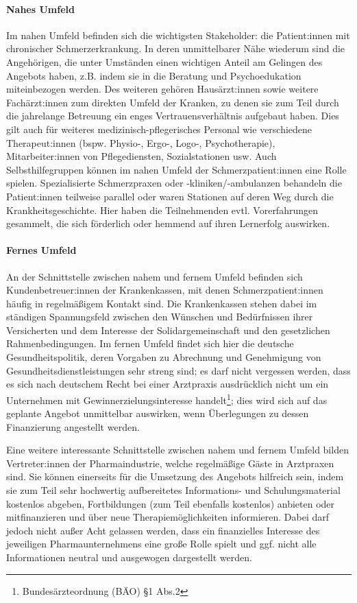 \documentclass[
  twoside,
  parskip=half-,
  paper=176mm:246mm,
  BCOR=14mm,
  DIV=14,
]{scrreprt}
\begin{document}
\begin{praxis}
\paragraph{Nahes Umfeld} Im nahen Umfeld befinden sich die wichtigsten Stakeholder: die Patient:innen mit chronischer Schmerzerkrankung. In deren unmittelbarer Nähe wiederum sind die Angehörigen, die unter Umständen einen wichtigen Anteil am Gelingen des Angebots haben, z.B. indem sie in die Beratung und Psychoedukation miteinbezogen werden. Des weiteren gehören Hausärzt:innen sowie weitere Fachärzt:innen zum direkten Umfeld der Kranken, zu denen sie zum Teil durch die jahrelange Betreuung ein enges Vertrauensverhältnis aufgebaut haben. Dies gilt auch für weiteres medizinisch-pflegerisches Personal wie verschiedene Therapeut:innen (bspw. Physio-, Ergo-, Logo-, Psychotherapie), Mitarbeiter:innen von Pflegediensten, Sozialstationen usw. Auch Selbsthilfegruppen können im nahen Umfeld der Schmerzpatient:innen eine Rolle spielen. Spezialisierte Schmerzpraxen oder -kliniken/-ambulanzen behandeln die Patient:innen teilweise parallel oder waren Stationen auf deren Weg durch die Krankheitsgeschichte. Hier haben die Teilnehmenden evtl. Vorerfahrungen gesammelt, die sich förderlich oder hemmend auf ihren Lernerfolg auswirken.

\paragraph{Fernes Umfeld} An der Schnittstelle zwischen nahem und fernem Umfeld befinden sich Kundenbetreuer:innen der Krankenkassen, mit denen Schmerzpatient:innen häufig in regelmäßigem Kontakt sind. Die Krankenkassen stehen dabei im ständigen Spannungsfeld zwischen den Wünschen und Bedürfnissen ihrer Versicherten und dem Interesse der Solidargemeinschaft und den gesetzlichen Rahmenbedingungen. Im fernen Umfeld findet sich hier die deutsche Gesundheitspolitik, deren Vorgaben zu Abrechnung und Genehmigung von Gesundheitsdienstleistungen sehr streng sind; es darf nicht vergessen werden, dass es sich nach deutschem Recht bei einer Arztpraxis ausdrücklich nicht um ein Unternehmen mit Gewinnerzielungsinteresse handelt\footnote{Bundesärzteordnung (BÄO) §1 Abs.2}; dies wird sich auf das geplante Angebot unmittelbar auswirken, wenn Überlegungen zu dessen Finanzierung angestellt werden. 

Eine weitere interessante Schnittstelle zwischen nahem und fernem Umfeld bilden Vertreter:innen der Pharmaindustrie, welche regelmäßige Gäste in Arztpraxen sind. Sie können einerseits für die Umsetzung des Angebots hilfreich sein, indem sie zum Teil sehr hochwertig aufbereitetes Informations- und Schulungsmaterial kostenlos abgeben, Fortbildungen (zum Teil ebenfalls kostenlos) anbieten oder mitfinanzieren und über neue Therapiemöglichkeiten informieren. Dabei darf jedoch nicht außer Acht gelassen werden, dass ein finanzielles Interesse des jeweiligen Pharmaunternehmens eine große Rolle spielt und ggf. nicht alle Informationen neutral und ausgewogen dargestellt werden. 
\end{praxis}
\end{document}
